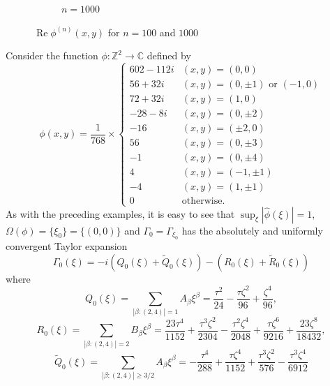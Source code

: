 \documentclass[smallextended]{svjour3}
\theoremstyle{remark}
\renewcommand\Re{\operatorname{Re}}%
\newcommand{\f}[2]{\frac{#1}{#2}}
\begin{document}
\begin{example}
\begin{figure}[!htb]
\begin{subfigure}{0.49\textwidth}
    \caption{$n = 1000$}
    \label{fig:Conv_Pwr_00b}
    \end{subfigure}
    \caption{$\Re\phi^{(n)}(x,y)$ for $n=100$ and $1000$}
    \label{fig:Conv_Pwr_00}
\end{figure}
\end{example}

\begin{example}\normalfont
Consider the function $\phi : \mathbb{Z}^2 \to \mathbb{C}$ defined by 
\begin{equation*}
    \phi(x,y) = 
    \f{1}{768}\times
    \begin{cases}
    602 - 112i &(x,y) = (0,0)\\
    56 + 32i   &(x,y) = (0,\pm 1)\mbox{ or }(-1,0)\\
    72 + 32i   &(x,y) = (1,0)\\
    -28 - 8i   &(x,y) = (0,\pm 2)\\
    -16        &(x,y) = (\pm 2,0)\\
    56         &(x,y) = (0,\pm 3)\\
    -1         &(x,y) = (0,\pm 4)\\
    4          &(x,y) = (-1,\pm 1)\\
    -4         &(x,y) = (1,\pm 1)\\
    0          &\text{otherwise}.
    \end{cases}
\end{equation*}
As with the preceding examples, it is easy to see that $\sup_{\xi}|\widehat{\phi}(\xi)|=1$, $\Omega(\phi)=\{\xi_0\}=\{(0,0)\}$ and $\Gamma_{0}=\Gamma_{\xi_0}$ has the absolutely and uniformly convergent Taylor expansion
\begin{equation*}
    \Gamma_{0}(\xi)=-i\left(Q_0(\xi)+\widetilde{Q}_0(\xi)\right)-\left(R_0(\xi)+\widetilde{R}_0(\xi)\right)
\end{equation*}
where
\begin{equation*}
    Q_0(\xi)=\sum_{|\beta:(2,4)|=1}A_\beta \xi^\beta=\frac{\tau^2}{24}-\frac{\tau\zeta^2}{96} +\frac{ \zeta^4}{96},
\end{equation*}
\begin{equation*}
    R_0(\xi)=\sum_{|\beta:(2,4)|=2}B_\beta \xi^\beta=\frac{23\tau^4}{1152}  + \frac{\tau^3\zeta^2}{2304}  - \frac{\tau^2\zeta^4}{2048} + \f{\tau\zeta^6}{9216}+ \frac{23\zeta^8}{18432},
\end{equation*}
\begin{equation*}
    \widetilde{Q}_0(\xi)=\sum_{|\beta:(2,4)|\geq 3/2}A_\beta \xi^\beta=- \frac{\tau^4}{288}+\frac{\tau\zeta^4}{1152} +\frac{\tau^3\zeta^2}{576}  -\frac{\tau^3\zeta^4}{6912} 

\end{equation*}
\end{example}
\end{document}
